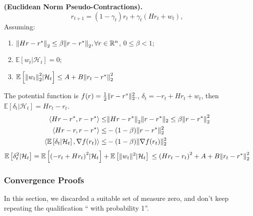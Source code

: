 \begin{example}
    \textbf{(Euclidean Norm Pseudo-Contractions).}
    \[
        r_{t+1} = (1 - \gamma_t) r_t + \gamma_t (H r_t + w_t),
    \]
    Assuming:
    \begin{enumerate}
        \item $ {\Arrowvert Hr - r^* \Arrowvert}_2 \le \beta {\Arrowvert r - r^* \Arrowvert}_2, \forall r \in \mathbb{R}^{n} $, $ 0 \le \beta < 1 $;
        \item $ \mathbb{E}\left[ w_t | \mathcal{H}_t \right] = 0 $;
            \item $ \mathbb{E} \left[ {\Arrowvert w_t \Arrowvert}^2_2 | \mathcal{H}_t  \right] \le A + B {\Arrowvert r_t - r^* \Arrowvert}^2_2 $
    \end{enumerate}

    The potential function is $ f(r) = \frac{1}{2} \Arrowvert r - r^* \Arrowvert^2_2. $, $ \delta_t = - r_t + H r_t + w_t $, then $ \mathbb{E} \left[ \delta_t | \mathcal{H}_t \right] = H r_t - r_t $.
    \begin{align*}
        \langle Hr - r^*, r - r^* \rangle \le& {\Arrowvert Hr - r^* \Arrowvert}_2 \Arrowvert r - r^* \Arrowvert_2 \le \beta {\Arrowvert r - r^* \Arrowvert}^2_2\\
        \langle Hr - r, r - r^* \rangle \le& -(1 - \beta) \Arrowvert r - r^* \Arrowvert^2_2\\
        \langle \mathbb{E} \left[ \delta_t | \mathcal{H}_t \right], \nabla f(r_t) \rangle \le& -(1-\beta) \Arrowvert \nabla f(r_t) \Arrowvert^2_2
    \end{align*}
    \[
    \mathbb{E}\left[ \delta^2_t | \mathcal{H}_t \right] = \mathbb{E}\left[ {(-r_t + H r_t)}^2 | \mathcal{H}_t \right] + \mathbb{E}\left[ \Arrowvert w_t \Arrowvert^2 | \mathcal{H}_t \right] \\
    \le {(H r_t - r_t)}^2 + A + B {\Arrowvert r_t - r^* \Arrowvert}_2^2
    \]
\end{example}

\subsubsection{Convergence Proofs}%
\label{ssub:convergence_proofs}

In this section, we discarded a suitable set of measure zero, and don't keep repeating the qualification `` with probability 1''.

